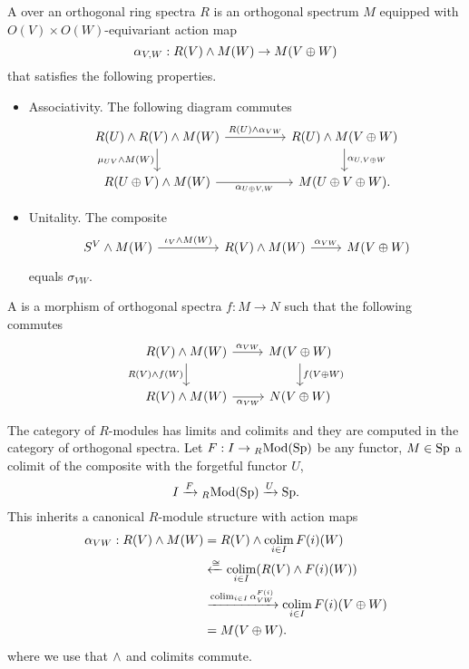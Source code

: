 \begin{definition}
A  over an orthogonal ring spectra $R$ is an orthogonal spectrum $M$ equipped with $O(V)\times O(W)$-equivariant action map
\[\alpha_{V,W}:R(V)\wedge M(W)\to M(V\oplus W)\]
that satisfies the following properties.
\begin{itemize}
\item Associativity. The following diagram commutes
\[
\begin{tikzcd}
R(U) \smsh R(V) \smsh M(W) \arrow[d, "\mu_{UV} \smsh M(W)", swap] \arrow[rr, "R(U) \smsh \alpha_{VW}"] & & R(U) \smsh M(V \oplus W) \arrow[d, "{\alpha_{U, V \oplus W}}"]\\
R(U \oplus V) \smsh M(W) \arrow[rr, "{\alpha_{U \oplus V, W}}", swap] & & M(U \oplus V \oplus W).
\end{tikzcd}
\]
\item Unitality. The composite
\[
\begin{tikzcd}
S^V \smsh M(W) \arrow[rr, "\iota_V \smsh M(W)"] & & R(V) \smsh M(W) \arrow[r, "\alpha_{VW}"] & M(V \oplus W)
\end{tikzcd}
\]
equals $\sigma_{VW}$.
\end{itemize}
A  is a morphism of orthogonal spectra $f:M \to N$ such that the following commutes
\[
\begin{tikzcd}
R(V) \smsh M(W) \arrow[d, "R(V) \smsh f(W)", swap] \arrow[r, "\alpha_{VW}"] & M(V \oplus W) \arrow[d, "f(V \oplus W)"]\\
R(V) \smsh M(W) \arrow[r, "\alpha_{VW}", swap] & N(V \oplus W)
\end{tikzcd}
\]
\end{definition}

\begin{remark}
The category of $R$-modules has limits and colimits and they are computed in the category of orthogonal spectra. Let $F:I\to{}_{R\!}\operatorname{Mod}({\normalfont\textup{Sp}})$ be any functor, $M\in{\normalfont\textup{Sp}}$ a colimit of the composite with the forgetful functor $U$,
\[I\xrightarrow{F}{}_{R\!}\operatorname{Mod}({\normalfont\textup{Sp}})\xrightarrow{U}{\normalfont\textup{Sp}}.\]
This inherits a canonical $R$-module structure with action maps
\begin{align*}
\alpha_{VW} : R(V) \wedge M(W) &= R(V) \wedge \operatorname*{colim}_{i \in I} F(i)(W)\\
&\xleftarrow{\cong} \operatorname*{colim}_{i \in I} (R(V) \wedge F(i)(W))\\
&\xrightarrow{\operatorname*{colim}_{i \in I} \alpha_{VW}^{F(i)}} \operatorname*{colim}_{i \in I} F(i)(V \oplus W)\\
&= M(V \oplus W).
\end{align*} 
where we use that $\wedge$ and colimits commute.
\end{remark}

